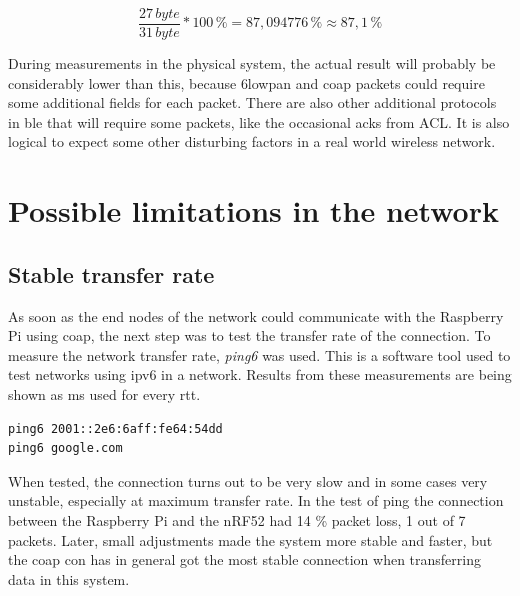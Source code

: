 \begin{equation}
    \frac{27 \, byte}{31 \, byte}*100 \,\% = 87,094776 \,\% \approx 87,1 \,\%
\end{equation}


\noindent During measurements in the physical system, the actual result will probably be considerably lower than this, because \gls{6lowpan} and \gls{coap} packets could require some additional fields for each packet. There are also other additional protocols in \gls{ble} that will require some packets, like the occasional \glspl{ack} from ACL. It is also logical to expect some other disturbing factors in a real world wireless network. 

\section{Possible limitations in the network}

\subsection{Stable transfer rate}

As soon as the end nodes of the network could communicate with the Raspberry Pi using \gls{coap}, the next step was to test the transfer rate of the connection. To measure the network transfer rate, \textit{ping6} was used. This is a software tool used to test networks using \gls{ipv6} in a network. Results from these measurements are being shown as ms used for every \acrlong{rtt}. 

\begin{verbatim}
ping6 2001::2e6:6aff:fe64:54dd
ping6 google.com
\end{verbatim}


\noindent When tested, the connection turns out to be very slow and in some cases very unstable, especially at maximum transfer rate. In the test of ping the connection between the Raspberry Pi and the nRF52 had 14 \% packet loss, 1 out of 7 packets. Later, small adjustments made the system more stable and faster, but the \gls{coap} \gls{con} has in general got the most stable connection when transferring data in this system.  

